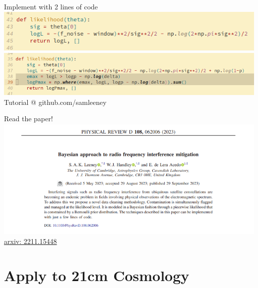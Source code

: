 \documentclass[aspectratio=169]{beamer}
\begin{document}
\begin{frame}{Implement with 2 lines of code}
  \includegraphics[width=1\textwidth]{images/logl1.png}
  \includegraphics[width=1\textwidth]{images/logl2.png}
  \centering Tutorial @ github.com/samleeney
\end{frame}

\begin{frame}{Read the paper!}
  \includegraphics[width=1\textwidth]{images/paper1.png}
  \href{https://arxiv.org/abs/2211.15448}{arxiv: 2211.15448}
\end{frame}

\section{Apply to 21cm Cosmology}
\end{document}
